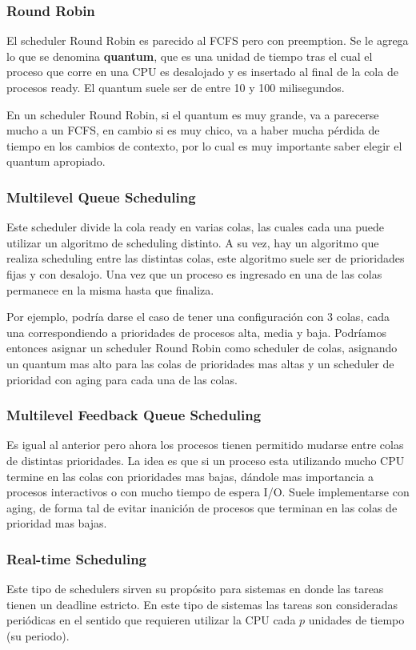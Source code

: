 \documentclass{article}
\begin{document}
\subsubsection{Round Robin}

El scheduler Round Robin es parecido al FCFS pero con preemption. Se le agrega lo que se denomina \textbf{quantum}, que es una unidad de tiempo tras el cual el proceso que corre en una CPU es desalojado y es insertado al final de la cola de procesos ready. El quantum suele ser de entre 10 y 100 milisegundos.

En un scheduler Round Robin, si el quantum es muy grande, va a parecerse mucho a un FCFS, en cambio si es muy chico, va a haber mucha p\'erdida de tiempo en los cambios de contexto, por lo cual es muy importante saber elegir el quantum apropiado.

\subsubsection{Multilevel Queue Scheduling}
Este scheduler divide la cola ready en varias colas, las cuales cada una puede utilizar un algoritmo de scheduling distinto. A su vez, hay un algoritmo que realiza scheduling entre las distintas colas, este algoritmo suele ser de prioridades fijas y con desalojo. Una vez que un proceso es ingresado en una de las colas permanece en la misma hasta que finaliza. 

Por ejemplo, podría darse el caso de tener una configuración con 3 colas, cada una correspondiendo a prioridades de procesos alta, media y baja. Podríamos entonces asignar un scheduler Round Robin como scheduler de colas, asignando un quantum mas alto para las colas de prioridades mas altas y un scheduler de prioridad con aging para cada una de las colas.

\subsubsection{Multilevel Feedback Queue Scheduling}
Es igual al anterior pero ahora los procesos tienen permitido mudarse entre colas de distintas prioridades. La idea es que si un proceso esta utilizando mucho CPU termine en las colas con prioridades mas bajas, dándole mas importancia a procesos interactivos o con mucho tiempo de espera I/O. Suele implementarse con aging, de forma tal de evitar inanición de procesos que terminan en las colas de prioridad mas bajas.

\subsubsection{Real-time Scheduling}
Este tipo de schedulers sirven su propósito para sistemas en donde las tareas tienen un deadline estricto. En este tipo de sistemas las tareas son consideradas periódicas en el sentido que requieren utilizar la CPU cada $p$ unidades de tiempo (su periodo).
\end{document}
